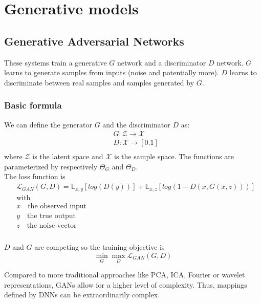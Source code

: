 \documentclass[../main.tex]{subfiles}
\begin{document}
\chapter{Generative models}

\section{Generative Adversarial Networks}
These systems train a generative $G$ network and a discriminator $D$ network. $G$ learns to generate
samples from inputs (noise and potentially more). $D$ learns to discriminate between real samples and
samples generated by $G$.

\subsection{Basic formula}
We can define the generator $G$ and the discriminator $D$ as:
\begin{align*}
    &G: \mathcal{Z} \to \mathcal{X} \\
    &D: \mathcal{X} \to [0. 1] \\
\end{align*}
where $\mathcal{Z}$ is the latent space and $\mathcal{X}$ is the sample space. The functions are
parameterized by respectively $\Theta_G$ and $\Theta_D$. \\
The loss function is
\begin{align*}
    &\mathcal{L}_{GAN}(G, D) = \mathbb{E}_{x,y}[log(D(y))] + \mathbb{E}_{x,z}[log(1-D(x, G(x, z)))] \\
    &\text{with} \\
    & x\quad \text{the observed input} \\
    & y\quad \text{the true output} \\
    & z\quad \text{the noise vector} \\
\end{align*} \\
$D$ and $G$ are competing so the training objective is
\begin{equation}
    \min_G \max_D \mathcal{L}_{GAN}(G, D)
\end{equation}

Compared to more traditional approaches like PCA, ICA, Fourier or wavelet representations, GANs allow
for a higher level of complexity. Thus, mappings defined by DNNs can be extraordinarily complex. \\
\end{document}
